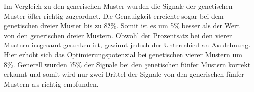 Im Vergleich zu den generischen Muster wurden die Signale der genetischen Muster {\"o}fter richtig zugeordnet. 
Die Genauigkeit erreichte sogar bei dem genetischen dreier Muster bis zu 82\%. 
Somit ist es um 5\% besser als der Wert von den generischen dreier Mustern.
Obwohl der Prozentsatz bei den vierer Mustern insgesamt gesunken ist, gewinnt jedoch der Unterschied an Ausdehnung.
Hier erh{\"o}ht sich das Optimierungspotenzial bei genetischen vierer Mustern um 8\%.
Generell wurden 75\% der Signale bei den genetischen f{\"u}nfer Mustern korrekt erkannt und somit wird nur zwei Drittel der Signale von den generischen f{\"u}nfer Mustern als richtig empfunden.





